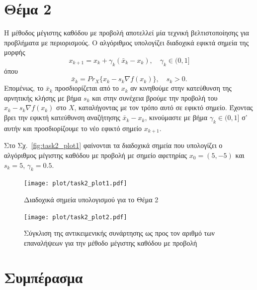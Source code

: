 \documentclass[a4paper,12pt]{article}
\begin{document}
\section*{Θέμα 2}
Η μέθοδος μέγιστης καθόδου με προβολή αποτελλεί μία τεχνική βελτιστοποίησης για προβλήματα με περιορισμούς.
Ο αλγόριθμος υπολογίζει διαδοχικά εφικτά σημεία της μορφής
\[
x_{k+1} = x_k + \gamma_k (\bar{x}_k - x_k), \quad \gamma_k \in (0, 1]
\]
όπου
\[
\bar{x}_k = Pr_X\{x_k - s_k \nabla f(x_k)\}, \quad s_k > 0.
\]
Επομένως, το $\bar{x}_k$ προσδιορίζεται από το $x_k$ αν κινηθούμε στην κατεύθυνση της αρνητικής κλήσης με
βήμα $s_k$ και στην συνέχεια βρούμε την προβολή του $x_k - s_k \nabla f(x_k)$ στο $X$, καταλήγοντας με τον
τρόπο αυτό σε εφικτό σημείο. Έχοντας βρει την εφικτή κατεύθυνση αναζήτησης $\bar{x}_k - x_k$, κινούμαστε με
βήμα $\gamma_k \in (0, 1]$ σ' αυτήν και προσδιορίζουμε το νέο εφικτό σημείο $x_{k+1}$.

Στο Σχ.~\ref{fig:task2_plot1} φαίνονται τα διαδοχικά σημεία που υπολογίζει ο αλγόριθμος μέγιστης καθόδου με
προβολή με σημείο αφετηρίας $x_0 = (5, -5)$ και $s_k = 5$, $\gamma_k = 0.5$.

\begin{figure}[h]
    \centering
    \begin{minipage}{0.47\textwidth}
        \centering
        \texttt{[image: plot/task2\_plot1.pdf]}
        \caption{\small Διαδοχικά σημεία υπολογισμού για το Θέμα 2}
        \label{fig:task2_plot1}
    \end{minipage} \hfill
    \begin{minipage}{0.47\textwidth}
        \centering
        \texttt{[image: plot/task2\_plot2.pdf]}
        \caption{\small Σύγκλιση της αντικειμενικής συνάρτησης ως προς τον αριθμό των επαναλήψεων για την μέθοδο μέγιστης καθόδου με προβολή}
        \label{fig:task2_plot2}
    \end{minipage}
\end{figure}

\section*{Συμπέρασμα}
\end{document}
